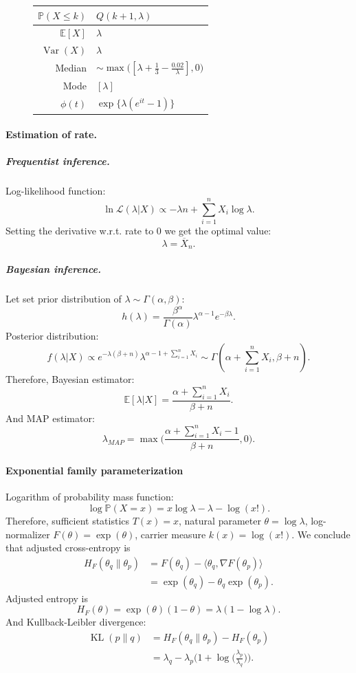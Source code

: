 \documentclass[a4paper,11pt]{article}
\theoremstyle{plain}
\theoremstyle{definition}
\newcommand{\ME}{\mathbb{E}}
\newcommand{\MP}{\mathbb{P}}
\newcommand{\Var}{\operatorname{Var}}
\begin{document}
\begin{figure}[!htb]
\begin{minipage}{0.4\textwidth}
\begin{tabular}{| r | l |}
					\hline
					$\MP(X \leq k)$ & $Q(k+1, \lambda)$ \\
					\hline
					$\ME[X]$ & $ \lambda$ \\
					\hline
					$\Var(X)$ & $\lambda$ \\
					\hline
					Median & $\sim \max\big([\lambda + \frac{1}{3} - \frac{0.02}{\lambda}], 0\big) $ \\
					\hline
					Mode & $[\lambda]$ \\
					\hline
					$\phi(t)$ & $ \exp \{ \lambda(e^{it}-1) \}  $ \\
					\hline
				\end{tabular}
			\end{minipage}
		\end{figure}
	
	\paragraph{Estimation of rate.}
	\subparagraph{Frequentist inference.}
	Log-likelihood function:
	\[ \ln \mathcal{L}(\lambda | X) \propto -\lambda n + \sum_{i=1}^{n}X_i \log \lambda. \]
	Setting the derivative w.r.t. rate to $0$ we get the optimal value:
	\[ \lambda = \overline{X}_n. \]
	\subparagraph{Bayesian inference.}
	Let set prior distribution of $\lambda \sim \Gamma(\alpha, \beta)$:
	\[
	h(\lambda) = \frac{\beta^\alpha}{\Gamma(\alpha)} \lambda^{\alpha-1}e^{-\beta \lambda}.
	\]
	Posterior distribution:
	\[
	f(\lambda|X) \propto e^{-\lambda (\beta + n)}  \lambda^{\alpha - 1 + \sum_{i=1}^{n}X_i} \sim \Gamma(\alpha + \sum_{i=1}^{n}X_i, \beta + n).
	\]
	Therefore, Bayesian estimator:
	\[
	\mathbb{E}[\lambda|X] = \frac{\alpha + \sum_{i=1}^{n}X_i}{\beta + n}.
	\]
	And MAP estimator:
	\[
	\lambda_{MAP} = \max \bigg( \frac{\alpha + \sum_{i=1}^{n}X_i - 1}{\beta + n}, 0 \bigg).
	\]
	
	\paragraph{Exponential family parameterization}
	Logarithm of probability mass function:
	\[
	\log \MP(X = x) = x \log \lambda - \lambda - \log(x!).
	\]
	Therefore, sufficient statistics $T(x) = x$, natural parameter $\theta = \log \lambda$, log-normalizer $F(\theta) = \exp(\theta)$, carrier measure $k(x) = \log(x!)$. We conclude that adjusted cross-entropy is
	\[
	\begin{aligned}
	H_F(\theta_q \| \theta_p) &= F(\theta_q) - \langle \theta_q, \nabla F(\theta_p) \rangle \\
	&= \exp(\theta_q) - \theta_q \exp(\theta_p).
	\end{aligned}
	\]
	Adjusted entropy is
	\[
	H_F(\theta) = \exp(\theta) (1 - \theta) = \lambda (1 - \log \lambda).
	\]
	And Kullback-Leibler divergence:
	\[
	\begin{aligned}
	\operatorname{KL}(p \| q) &= H_F(\theta_q \| \theta_p) - H_F(\theta_p) \\
	&= \lambda_q -  \lambda_p \bigg(1 + \log \bigg(\frac{\lambda_p}{\lambda_q}\bigg)\bigg).
	\end{aligned}
	\]
	
\end{document}

